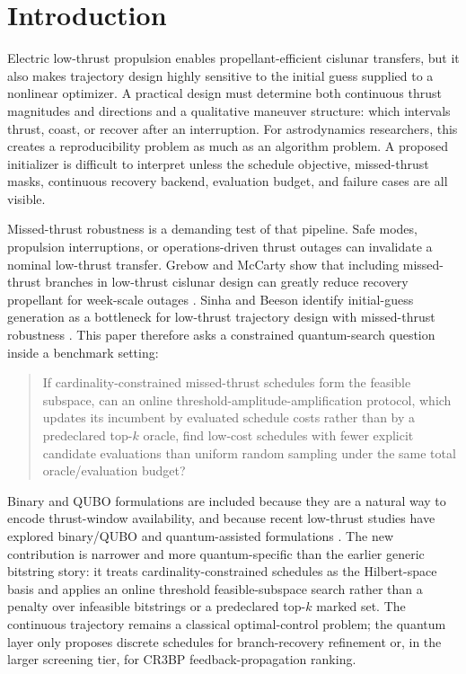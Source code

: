 \documentclass[preprint,12pt]{elsarticle}
\begin{document}
\section{Introduction}

Electric low-thrust propulsion enables propellant-efficient cislunar transfers, but it also makes trajectory design highly sensitive to the initial guess supplied to a nonlinear optimizer. A practical design must determine both continuous thrust magnitudes and directions and a qualitative maneuver structure: which intervals thrust, coast, or recover after an interruption. For astrodynamics researchers, this creates a reproducibility problem as much as an algorithm problem. A proposed initializer is difficult to interpret unless the schedule objective, missed-thrust masks, continuous recovery backend, evaluation budget, and failure cases are all visible.

Missed-thrust robustness is a demanding test of that pipeline. Safe modes, propulsion interruptions, or operations-driven thrust outages can invalidate a nominal low-thrust transfer. Grebow and McCarty show that including missed-thrust branches in low-thrust cislunar design can greatly reduce recovery propellant for week-scale outages \cite{grebow2020missed}. Sinha and Beeson identify initial-guess generation as a bottleneck for low-thrust trajectory design with missed-thrust robustness \cite{sinha2025initial}. This paper therefore asks a constrained quantum-search question inside a benchmark setting:
\begin{quote}
If cardinality-constrained missed-thrust schedules form the feasible subspace, can an online threshold-amplitude-amplification protocol, which updates its incumbent by evaluated schedule costs rather than by a predeclared top-$k$ oracle, find low-cost schedules with fewer explicit candidate evaluations than uniform random sampling under the same total oracle/evaluation budget?
\end{quote}

Binary and QUBO formulations are included because they are a natural way to encode thrust-window availability, and because recent low-thrust studies have explored binary/QUBO and quantum-assisted formulations \cite{degrossi2025transcription,moretta2026quantum}. The new contribution is narrower and more quantum-specific than the earlier generic bitstring story: it treats cardinality-constrained schedules as the Hilbert-space basis and applies an online threshold feasible-subspace search rather than a penalty over infeasible bitstrings or a predeclared top-$k$ marked set. The continuous trajectory remains a classical optimal-control problem; the quantum layer only proposes discrete schedules for branch-recovery refinement or, in the larger screening tier, for CR3BP feedback-propagation ranking.
\end{document}
